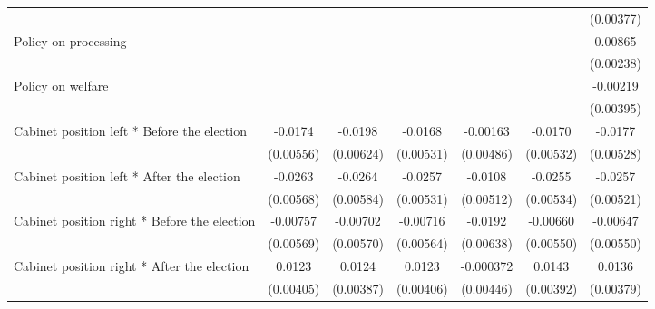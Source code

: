 \begin{table}[htbp]
\begin{tabular}{l*{6}{c}}
                    &                     &                     &                     &                     &                     &   (0.00377)         \\
[1em]
Policy on processing&                     &                     &                     &                     &                     &     0.00865\sym{***}\\
                    &                     &                     &                     &                     &                     &   (0.00238)         \\
[1em]
Policy on welfare   &                     &                     &                     &                     &                     &    -0.00219         \\
                    &                     &                     &                     &                     &                     &   (0.00395)         \\
[1em]
Cabinet position left * Before the election&     -0.0174\sym{**} &     -0.0198\sym{**} &     -0.0168\sym{**} &    -0.00163         &     -0.0170\sym{**} &     -0.0177\sym{**} \\
                    &   (0.00556)         &   (0.00624)         &   (0.00531)         &   (0.00486)         &   (0.00532)         &   (0.00528)         \\
[1em]
Cabinet position left * After the election&     -0.0263\sym{***}&     -0.0264\sym{***}&     -0.0257\sym{***}&     -0.0108\sym{*}  &     -0.0255\sym{***}&     -0.0257\sym{***}\\
                    &   (0.00568)         &   (0.00584)         &   (0.00531)         &   (0.00512)         &   (0.00534)         &   (0.00521)         \\
[1em]
Cabinet position right * Before the election&    -0.00757         &    -0.00702         &    -0.00716         &     -0.0192\sym{**} &    -0.00660         &    -0.00647         \\
                    &   (0.00569)         &   (0.00570)         &   (0.00564)         &   (0.00638)         &   (0.00550)         &   (0.00550)         \\
[1em]
Cabinet position right * After the election&      0.0123\sym{**} &      0.0124\sym{**} &      0.0123\sym{**} &   -0.000372         &      0.0143\sym{***}&      0.0136\sym{***}\\
                    &   (0.00405)         &   (0.00387)         &   (0.00406)         &   (0.00446)         &   (0.00392)         &   (0.00379)         \\

\end{tabular}
\end{table}
